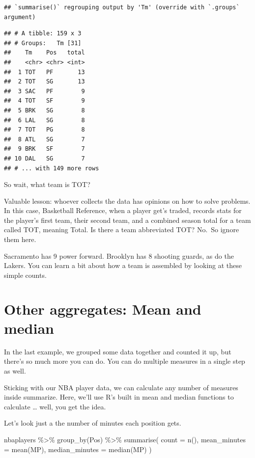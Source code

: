 \documentclass[
]{book}
\newenvironment{Shaded}{\begin{snugshade}}{\end{snugshade}}
\newcommand{\AttributeTok}[1]{\textcolor[rgb]{0.77,0.63,0.00}{#1}}
\newcommand{\FunctionTok}[1]{\textcolor[rgb]{0.00,0.00,0.00}{#1}}
\newcommand{\NormalTok}[1]{#1}
\newcommand{\SpecialCharTok}[1]{\textcolor[rgb]{0.00,0.00,0.00}{#1}}
\begin{document}
\begin{verbatim}
## `summarise()` regrouping output by 'Tm' (override with `.groups` argument)
\end{verbatim}

\begin{verbatim}
## # A tibble: 159 x 3
## # Groups:   Tm [31]
##    Tm    Pos   total
##    <chr> <chr> <int>
##  1 TOT   PF       13
##  2 TOT   SG       13
##  3 SAC   PF        9
##  4 TOT   SF        9
##  5 BRK   SG        8
##  6 LAL   SG        8
##  7 TOT   PG        8
##  8 ATL   SG        7
##  9 BRK   SF        7
## 10 DAL   SG        7
## # ... with 149 more rows
\end{verbatim}

So wait, what team is TOT?

Valuable lesson: whoever collects the data has opinions on how to solve problems. In this case, Basketball Reference, when a player get's traded, records stats for the player's first team, their second team, and a combined season total for a team called TOT, meaning Total. Is there a team abbreviated TOT? No.~So ignore them here.

Sacramento has 9 power forward. Brooklyn has 8 shooting guards, as do the Lakers. You can learn a bit about how a team is assembled by looking at these simple counts.

\hypertarget{other-aggregates-mean-and-median}{%
\section{Other aggregates: Mean and median}\label{other-aggregates-mean-and-median}}

In the last example, we grouped some data together and counted it up, but there's so much more you can do. You can do multiple measures in a single step as well.

Sticking with our NBA player data, we can calculate any number of measures inside summarize. Here, we'll use R's built in mean and median functions to calculate \ldots{} well, you get the idea.

Let's look just a the number of minutes each position gets.

\begin{Shaded}
\begin{Highlighting}[]
\NormalTok{nbaplayers }\SpecialCharTok{\%\textgreater{}\%}
  \FunctionTok{group\_by}\NormalTok{(Pos) }\SpecialCharTok{\%\textgreater{}\%}
  \FunctionTok{summarise}\NormalTok{(}
    \AttributeTok{count =} \FunctionTok{n}\NormalTok{(),}
    \AttributeTok{mean\_minutes =} \FunctionTok{mean}\NormalTok{(MP),}
    \AttributeTok{median\_minutes =} \FunctionTok{median}\NormalTok{(MP)}
\NormalTok{  )}
\end{Highlighting}
\end{Shaded}
\end{document}

